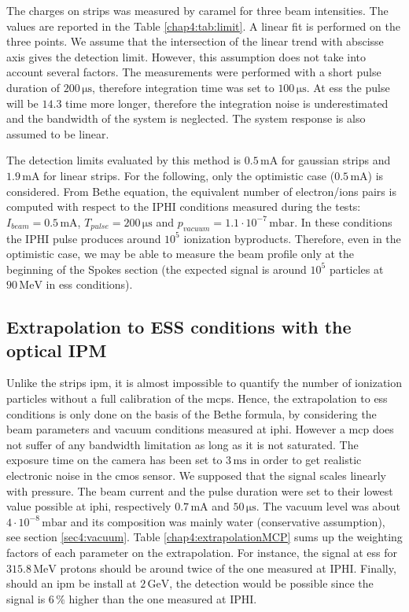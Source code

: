\begin{refsection}
  The charges on strips was measured by \acrshort{caramel} for three beam intensities. The values are reported in the Table \ref{chap4:tab:limit}. A linear fit is performed on the three points. We assume that the intersection of the linear trend with abscisse axis gives the detection limit. However, this assumption does not take into account several factors. The measurements were performed with a short pulse duration of $200\,\mathrm{\mu s}$, therefore integration time was set to $100\,\mathrm{\mu s}$. At \acrshort{ess} the pulse will be $14.3$ time more longer, therefore the integration noise is underestimated and the bandwidth of the system is neglected. The system response is also assumed to be linear.

  The detection limits evaluated by this method is $0.5\,\mathrm{mA}$ for gaussian strips and $1.9\,\mathrm{mA}$ for linear strips. For the following, only the optimistic case ($0.5\,\mathrm{mA}$) is considered. From Bethe equation, the equivalent number of electron/ions pairs is computed with respect to the IPHI conditions measured during the tests: $I_{beam}=0.5\,\mathrm{mA}$, $T_{pulse}=200\,\mathrm{\mu s}$ and $p_{vacuum}=1.1 \cdot 10^{-7}\,\mathrm{mbar}$.
  In these conditions the IPHI pulse produces around $10^{5}$ ionization byproducts.
  Therefore, even in the optimistic case, we may be able to measure the beam profile only at the beginning of the Spokes section (the expected signal is around $10^{5}$ particles at $90\,\mathrm{MeV}$ in \acrshort{ess} conditions).

  \subsection{Extrapolation to ESS conditions with the optical IPM}
  \label{chap4:sec:MCPess}
  Unlike the strips \acrshort{ipm}, it is almost impossible to quantify the number of ionization particles without a full calibration of the \acrshort{mcp}s. Hence, the extrapolation to \acrshort{ess} conditions is only done on the basis of the Bethe formula, by considering the beam parameters and vacuum conditions measured at \acrshort{iphi}.
  However a \acrshort{mcp} does not suffer of any bandwidth limitation as long as it is not saturated. The exposure time on the camera has been set to $3\,\mathrm{ms}$ in order to get realistic electronic noise in the \acrshort{cmos} sensor.
  We supposed that the signal scales linearly with pressure. The beam current and the pulse duration were set to their lowest value possible at \acrshort{iphi}, respectively $0.7\,\mathrm{mA}$ and $50\,\mathrm{\mu s}$. The vacuum level was about $4 \cdot 10^{-8}\,\mathrm{mbar}$ and its composition was mainly water (conservative assumption), see section \ref{sec4:vacuum}. Table \ref{chap4:extrapolationMCP} sums up the weighting factors of each parameter on the extrapolation. For instance, the signal at \acrshort{ess} for $315.8\,\mathrm{MeV}$ protons should be around twice of the one measured at IPHI. Finally, should an \acrshort{ipm} be install at $2\,\mathrm{GeV}$, the detection would be possible since the signal is $6\,\%$ higher than the one measured at IPHI.


\end{refsection}

